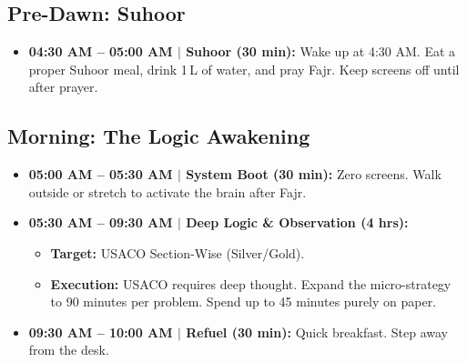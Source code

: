 \documentclass[12pt, a4paper]{article}
\begin{document}
\subsection{Pre-Dawn: Suhoor}

\begin{itemize}[leftmargin=2em, itemsep=6pt]

  \item \textbf{04:30 AM -- 05:00 AM $|$ Suhoor (30 min):} Wake up at 4:30 AM.
        Eat a proper Suhoor meal, drink 1\,L of water, and pray Fajr.
        Keep screens off until after prayer.

\end{itemize}

\subsection{Morning: The Logic Awakening}

\begin{itemize}[leftmargin=2em, itemsep=6pt]

  \item \textbf{05:00 AM -- 05:30 AM $|$ System Boot (30 min):} Zero screens.
        Walk outside or stretch to activate the brain after Fajr.

  \item \textbf{05:30 AM -- 09:30 AM $|$ Deep Logic \& Observation (4 hrs):}
    \begin{itemize}
      \item \textbf{Target:} USACO Section-Wise (Silver/Gold).
      \item \textbf{Execution:} USACO requires deep thought. Expand the
            micro-strategy to 90 minutes per problem. Spend up to 45 minutes
            purely on paper.
    \end{itemize}

  \item \textbf{09:30 AM -- 10:00 AM $|$ Refuel (30 min):} Quick breakfast.
        Step away from the desk.

\end{itemize}

\end{document}
